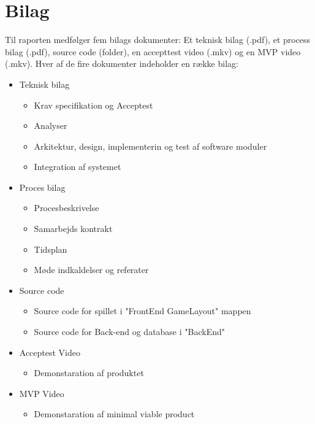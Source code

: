 \section{Bilag}

Til raporten medfølger fem bilags dokumenter: Et teknisk bilag (.pdf), et process bilag (.pdf), source code (folder), en accepttest video (.mkv) og en MVP video (.mkv). Hver af de fire dokumenter indeholder en række bilag:

\begin{itemize}
\item Teknisk bilag
	\begin{itemize}
	\item Krav specifikation og Acceptest
	\item Analyser
	\item Arkitektur, design, implementerin og test af software moduler
	\item Integration af systemet
	\end{itemize}

\item Proces bilag
	\begin{itemize}
	\item Procesbeskrivelse
	\item Samarbejds kontrakt
	\item Tidsplan
	\item Møde indkaldelser og referater
	\end{itemize}

\item Source code
	\begin{itemize}
	\item Source code for spillet i "FrontEnd GameLayout" mappen
	\item Source code for Back-end og database i "BackEnd"
	\end{itemize}

\item Acceptest Video
	\begin{itemize}
	\item Demonstaration af produktet
	\end{itemize}
	
\item MVP Video
	\begin{itemize}
	\item Demonstaration af minimal viable product
	\end{itemize}
\end{itemize}